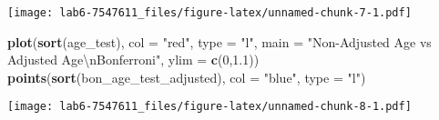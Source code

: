 \documentclass[]{article}
\newenvironment{Shaded}{\begin{snugshade}}{\end{snugshade}}
\newcommand{\KeywordTok}[1]{\textcolor[rgb]{0.13,0.29,0.53}{\textbf{{#1}}}}
\newcommand{\DataTypeTok}[1]{\textcolor[rgb]{0.13,0.29,0.53}{{#1}}}
\newcommand{\DecValTok}[1]{\textcolor[rgb]{0.00,0.00,0.81}{{#1}}}
\newcommand{\FloatTok}[1]{\textcolor[rgb]{0.00,0.00,0.81}{{#1}}}
\newcommand{\CharTok}[1]{\textcolor[rgb]{0.31,0.60,0.02}{{#1}}}
\newcommand{\StringTok}[1]{\textcolor[rgb]{0.31,0.60,0.02}{{#1}}}
\newcommand{\NormalTok}[1]{{#1}}
\begin{document}
\texttt{[image: lab6-7547611\_files/figure-latex/unnamed-chunk-7-1.pdf]}
\newpage

\begin{Shaded}
\begin{Highlighting}[]
\KeywordTok{plot}\NormalTok{(}\KeywordTok{sort}\NormalTok{(age_test), }\DataTypeTok{col =} \StringTok{"red"}\NormalTok{, }\DataTypeTok{type =} \StringTok{"l"}\NormalTok{,}
     \DataTypeTok{main =} \StringTok{"Non-Adjusted Age vs Adjusted Age}\CharTok{\textbackslash{}n}\StringTok{Bonferroni"}\NormalTok{, }\DataTypeTok{ylim =} \KeywordTok{c}\NormalTok{(}\DecValTok{0}\NormalTok{,}\FloatTok{1.1}\NormalTok{))}
\KeywordTok{points}\NormalTok{(}\KeywordTok{sort}\NormalTok{(bon_age_test_adjusted), }\DataTypeTok{col =} \StringTok{"blue"}\NormalTok{, }\DataTypeTok{type =} \StringTok{"l"}\NormalTok{)}
\end{Highlighting}
\end{Shaded}

\texttt{[image: lab6-7547611\_files/figure-latex/unnamed-chunk-8-1.pdf]}
\end{document}
